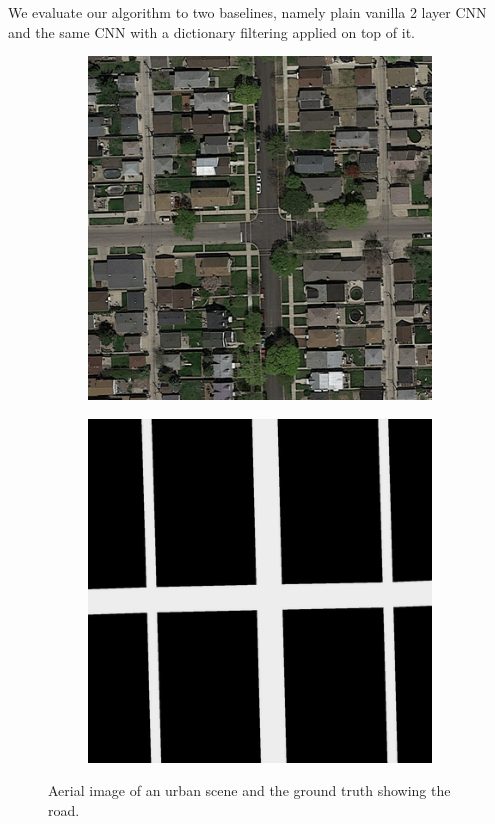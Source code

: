 \documentclass[10pt,conference,compsocconf]{IEEEtran}
\begin{document}
We evaluate our algorithm to two baselines, namely plain vanilla 2 layer CNN and the same CNN with a dictionary filtering applied on top of it.

\begin{figure}[]
	\centering
	\begin{subfigure}{.2\textwidth}
		\includegraphics[width=1\textwidth]{figs/img1.png}
	\end{subfigure}
	\begin{subfigure}{.2\textwidth}
		\includegraphics[width=1\textwidth]{figs/groundtruth1.png}
	\end{subfigure}
	\caption{Aerial image of an urban scene and the ground truth showing the road.}
\end{figure}
\end{document}
